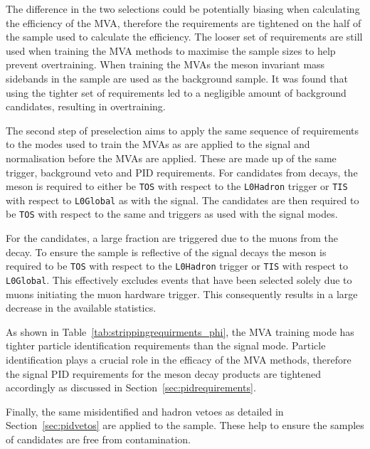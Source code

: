The difference in the two selections could be potentially biasing when calculating the efficiency of the MVA, therefore the requirements are tightened on the half of the \decay{\Bs}{\jpsi\phiz} sample used to calculate the efficiency. The looser set of requirements are still used when training the MVA methods to maximise the sample sizes to help prevent overtraining. When training the MVAs the \phiz meson invariant mass sidebands in the \decay{\Bs}{\jpsi\phiz} sample are used as the background sample. It was found that using the tighter set of requirements led to a negligible amount of background candidates, resulting in overtraining. 


The second step of preselection aims to apply the same sequence of requirements to the modes used to train the MVAs as are applied to the signal and normalisation before the MVAs are applied. These are made up of the same trigger, background veto and PID requirements.
For \Dsp candidates from \decay{\Bsb}{\Dsp\pim} decays, the \Bsb meson is required to either be \texttt{TOS} with respect to the \texttt{L0Hadron} trigger or \texttt{TIS} with respect to \texttt{L0Global} as with the signal. The \Bsb candidates are then required to be \texttt{TOS} with respect to the same \hltone and \hlttwo triggers as used with the signal modes.

For the \decay{\Bs}{\jpsi\phiz} candidates, a large fraction are triggered due to the muons from the \jpsi decay. To ensure the sample is reflective of the signal decays the \Bs meson is required to be \texttt{TOS} with respect to the \texttt{L0Hadron} trigger or \texttt{TIS} with respect to \texttt{L0Global}. This effectively excludes events that have been selected solely due to muons initiating the muon hardware trigger. This consequently results in a large decrease in the available statistics.

As shown in Table~\ref{tab:strippingrequirments_phi}, the MVA training mode has tighter particle identification requirements than the signal mode. Particle identification plays a crucial role in the efficacy of the MVA methods, therefore the signal PID requirements for the \phiz meson decay products are tightened accordingly as discussed in Section~\ref{sec:pidrequirements}.

Finally, the same misidentified \D and \Lc hadron vetoes as detailed in Section~\ref{sec:pidvetos} are applied to the \decay{\Bsb}{\Dsp\pim} sample. These help to ensure the samples of \Dsp candidates are free from contamination.





